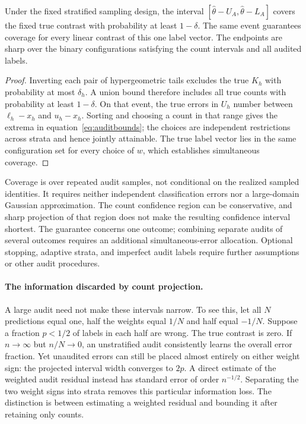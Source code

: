 \begin{proposition}\label{prop:audit}
Under the fixed stratified sampling design, the interval
$[\widehat\theta-U_A,\widehat\theta-L_A]$ covers the fixed true contrast with
probability at least $1-\delta$. The same event guarantees coverage for every
linear contrast of this one label vector. The endpoints are sharp over the
binary configurations satisfying the count intervals and all audited labels.
\end{proposition}
\begin{proof}
Inverting each pair of hypergeometric tails excludes the true $K_h$ with
probability at most $\delta_h$. A union bound therefore includes all true
counts with probability at least $1-\delta$. On that event, the true errors in
$U_h$ number between $\ell_h-x_h$ and $u_h-x_h$. Sorting and choosing a count
in that range gives the extrema in equation~\eqref{eq:auditbounds}; the choices
are independent restrictions across strata and hence jointly attainable.
The true label vector lies in the same configuration set for every choice of
$w$, which establishes simultaneous coverage.
\end{proof}
Coverage is over repeated audit samples, not conditional on the realized
sampled identities. It requires neither independent classification errors nor
a large-domain Gaussian approximation. The count confidence region can be
conservative, and sharp projection of that region does not make the resulting
confidence interval shortest. The guarantee concerns one outcome; combining
separate audits of several outcomes requires an additional simultaneous-error
allocation. Optional stopping, adaptive strata, and imperfect audit labels
require further assumptions or other audit procedures.

\paragraph{The information discarded by count projection.}
A large audit need not make these intervals narrow. To see this, let all $N$
predictions equal one, half the weights equal $1/N$ and half equal $-1/N$.
Suppose a fraction $p<1/2$ of labels in each half are wrong. The true contrast
is zero. If $n\to\infty$ but $n/N\to0$, an unstratified audit consistently
learns the overall error fraction. Yet unaudited errors can still be placed
almost entirely on either weight sign: the projected interval width converges
to $2p$. A direct estimate of the weighted audit residual instead has standard
error of order $n^{-1/2}$. Separating the two weight signs into strata removes
this particular information loss. The distinction is between estimating a
weighted residual and bounding it after retaining only counts.

